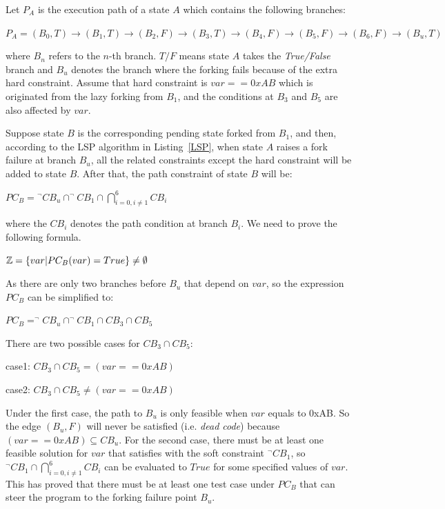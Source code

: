 Let $P_A$ is the execution path of a state $A$ which contains the following branches:
 

\begin{center}
$P_A = (B_0,T) \rightarrow (B_1,T) \rightarrow (B_2,F) \rightarrow (B_3,T)
\rightarrow (B_4,F) \rightarrow (B_5,F) \rightarrow (B_6,F) \rightarrow (B_u,T)$
\end{center}

\noindent where $B_n$ refers to the $n$-th branch. $T/F$ means state $A$ takes the \emph{True/False} branch and $B_u$ denotes the branch where the forking fails because of the extra hard constraint. Assume that hard constraint is $var==0xAB$ which is originated from the lazy forking from $B_1$, and the conditions at $B_3$ and $B_5$ are also affected by $var$.

Suppose state $B$ is the corresponding pending state forked from $B_1$, and then, according to the LSP algorithm in Listing~\ref{LSP}, when state $A$ raises a fork failure at branch $B_u$, all the related constraints except the hard constraint will be added to state $B$. After that, the path constraint of state $B$ will be:

\begin{center}
$PC_B = \displaystyle ^\neg CB_u \cap ^\neg CB_1 \cap \bigcap\limits_{i=0,i \neq 1}^{6} CB_i$
\end{center}
\noindent where the $CB_i$ denotes the path condition at branch $B_i$. We need to prove the following formula.

\begin{center}
$\mathbb{Z} = \{var\arrowvert PC_B(var) = True\} \neq \emptyset$
\end{center}

As there are only two branches before $B_u$ that depend on $var$, so the expression $PC_B$ can be simplified to:
\begin{center}
$PC_B = ^\neg CB_u \cap ^\neg CB_1 \cap CB_3 \cap CB_5$
\end{center}

There are two possible cases for $CB_3 \cap CB_5$:
\begin{center}
case1: $CB_3 \cap CB_5 = (var == 0xAB)$

case2: $CB_3 \cap CB_5 \neq (var == 0xAB)$
\end{center}

Under the first case, the path to $B_u$ is only feasible when $var$ equals to 0xAB. So the edge $(B_u, F)$ will never be satisfied (i.e. \emph{dead code}) because $(var == 0xAB) \subseteq CB_u$. For the second case, there must be at least one feasible solution for $var$ that satisfies with the soft constraint $^\neg CB_1$, so $^\neg CB_1 \cap \bigcap_{i=0,i \neq 1}^{6} CB_i$ can be evaluated to $True$ for some specified values of $var$. This has proved that there must be at least one test case under $PC_B$ that can steer the program to the forking failure point $B_u$.

